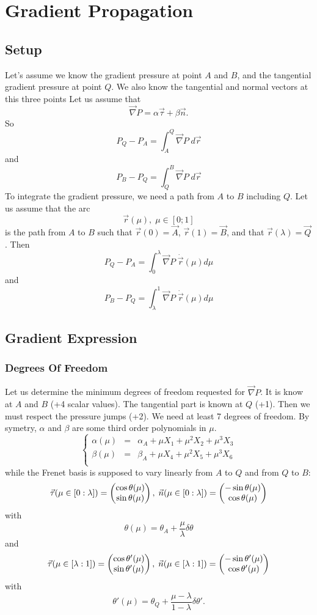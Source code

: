 \documentclass[11pt]{amsart}
\newcommand{\mygrad}{\vec{\nabla}}
\begin{document}
\section{Gradient Propagation}
\subsection{Setup}
Let's assume we know the gradient pressure at point $A$ and $B$, and
the tangential gradient pressure at point $Q$.
We also know the tangential and normal vectors at this three points
Let us assume that
\[
	\mygrad P = \alpha \vec{\tau} + \beta \vec{n}.
\]
So
\[
	P_Q - P_A = \int_A^Q \mygrad P \; d\vec{r}
\]
and
\[
	P_B - P_Q = \int_Q^B  \mygrad P \; d\vec{r}
\]
To integrate the gradient pressure, we need a path from $A$ to $B$ including $Q$.
Let us assume that the arc
\[
		\vec{r}(\mu), \;\mu\in[0;1]
\]
is the path from $A$ to $B$ such that $\vec{r}(0)=\vec{A}$, $\vec{r}(1)=\vec{B}$, and that $\vec{r}(\lambda)=\vec{Q}$.
Then
\[
	P_Q - P_A = \int_0^\lambda \mygrad P \; \dot{\vec{r}}(\mu) d\mu
\]
and
\[
	P_B - P_Q = \int_\lambda^1 \mygrad P \; \dot{\vec{r}}(\mu) d\mu
\]
\subsection{Gradient Expression}
\subsubsection{Degrees Of Freedom}
Let us determine the minimum degrees of freedom requested for $\mygrad P$.
It is know at $A$ and $B$ (+4 scalar values).
The tangential part is known at $Q$ (+1).
Then we must respect the pressure jumps (+2).
We need at least 7 degrees of freedom.
By symetry, $\alpha$ and $\beta$ are some third order polynomials in $\mu$.
\[
	\left\lbrace
	\begin{array}{rcl}
		\alpha(\mu) & = & \alpha_A + \mu X_1 + \mu^2 X_2 + \mu^3 X_3\\
		\beta(\mu)  & = & \beta_A  + \mu X_4 + \mu^2 X_5 + \mu^3 X_6\\
	\end{array}
	\right.
\]
while the Frenet basis is supposed to vary linearly from $A$ to $Q$ and from $Q$ to $B$:
\[
	\vec{\tau}(\mu\in[0:\lambda]) =
	\begin{pmatrix}
	 \cos \theta(\mu)\cr
	 \sin \theta(\mu)
	 \end{pmatrix},\;
	 \vec{n}(\mu\in[0:\lambda]) =
	\begin{pmatrix}
	 -\sin \theta(\mu)\cr
	 \cos \theta(\mu)
	 \end{pmatrix}
\]
with 
\[
	\theta(\mu) = \theta_A + \frac{\mu}{\lambda} \delta\theta
\]
and
\[
	\vec{\tau}(\mu\in[\lambda:1]) =
	\begin{pmatrix}
	 \cos \theta'(\mu)\cr
	 \sin \theta'(\mu)
	 \end{pmatrix},\;
	 \vec{n}(\mu\in[\lambda:1]) =
	\begin{pmatrix}
	 -\sin \theta'(\mu)\cr
	 \cos \theta'(\mu)
	 \end{pmatrix}
\]
with 
\[
	\theta'(\mu) = \theta_Q + \dfrac{\mu-\lambda}{1-\lambda} \delta\theta'.
\]
\end{document}
